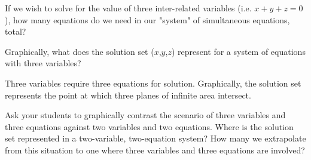 

If we wish to solve for the value of three inter-related variables (i.e. $x + y + z = 0$), how many equations do we need in our "system" of simultaneous equations, total?

Graphically, what does the solution set ($x$,$y$,$z$) represent for a system of equations with three variables?







Three variables require three equations for solution.  Graphically, the solution set represents the point at which three planes of infinite area intersect.







Ask your students to graphically contrast the scenario of three variables and three equations against two variables and two equations.  Where is the solution set represented in a two-variable, two-equation system?  How many we extrapolate from this situation to one where three variables and three equations are involved?




